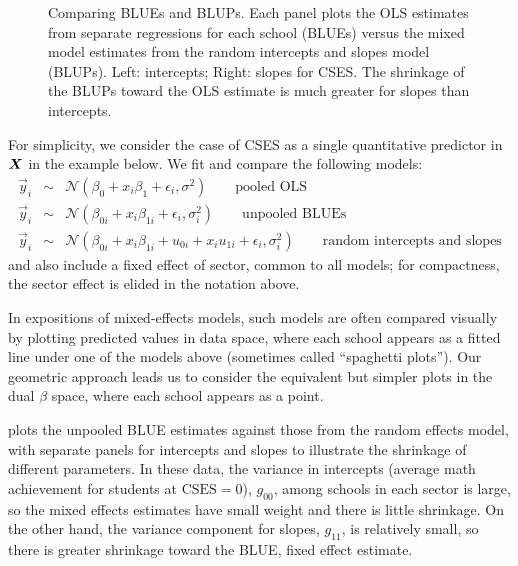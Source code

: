 \begin{figure}[htb]
\begin{minipage}[b]{.49\linewidth}
 \end{minipage}
  \caption{Comparing BLUEs and BLUPs. Each panel plots the OLS estimates from separate regressions for each school (BLUEs)
  versus the mixed model estimates from the random intercepts and slopes model (BLUPs).
  Left: intercepts; Right: slopes for CSES.  The shrinkage of the BLUPs toward the OLS estimate is much greater for slopes than
  intercepts. }
  \label{fig:hsbmix4}
\end{figure}

For simplicity, we consider the case of CSES as
a single quantitative predictor in $\bm{X}$ in the example below.  We fit and compare the following models:
\begin{eqnarray}
 \vec{y}_{i} & \sim & \mathcal{N} ( \beta_0 + x_{i} \beta_1 + \epsilon_{i}  , \sigma^2 ) \quad\quad \textrm{pooled OLS} \\
 \vec{y}_{i} & \sim & \mathcal{N} ( \beta_{0i} + x_{i} \beta_{1i} + \epsilon_{i}  , \sigma^2_i ) \quad\quad \textrm{unpooled BLUEs} \\
 \vec{y}_{i} & \sim & \mathcal{N} ( \beta_{0i} + x_{i} \beta_{1i} + u_{0i} + x_{i} u_{1i} + \epsilon_{i}  , \sigma^2_i ) \quad\quad \textrm{random intercepts and slopes}
%
\end{eqnarray}
and also include a fixed effect of sector, common to all models; for compactness, the sector effect is elided in the notation above.

In expositions of mixed-effects models, such models are often compared visually by plotting predicted values in data space, where each school appears
as a fitted line under one of the models above (sometimes called ``spaghetti plots'').
Our geometric approach leads us to consider the equivalent but simpler plots in the dual $\beta$ space,
where each school appears as a point.

 plots the unpooled BLUE estimates against those from the random effects model, with separate panels for intercepts
and slopes to illustrate the shrinkage of different parameters.  In these data, the variance in intercepts (average math achievement
for students at $\mathrm{CSES}=0$), $g_{00}$,
among schools in each sector is large, so the mixed effects estimates have small weight and there is little
shrinkage.  On the other hand, the variance component for slopes, $g_{11}$, is relatively small, so there is greater
shrinkage toward the BLUE, fixed effect estimate.

